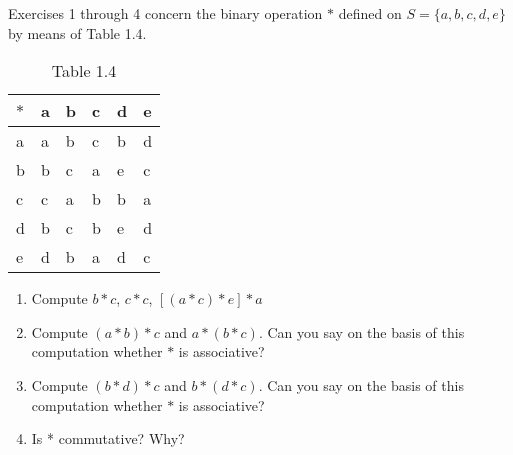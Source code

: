 \documentclass[10pt,letterpaper]{article}
\begin{document}
Exercises 1 through 4 concern the binary operation $ \ast $ defined on $S=\{a,b,c,d,e\}$ by means of Table 1.4.
  \begin{table}[h]
    \begin{center}
      \begin{tabular}{l|l|l|l|l|l}
        $\ast$ & a & b & c & d & e \\
        \hline
        a & a & b & c & b & d \\
        \hline
        b & b & c & a & e & c\\
        \hline
        c & c & a & b & b & a\\
        \hline
        d & b & c & b & e & d \\
        \hline
        e & d & b & a & d & c
      \end{tabular}
    \end{center}
    \captionsetup{labelformat=empty}
    \caption{Table 1.4}
  \end{table}
  \begin{enumerate}
    \item Compute $ b \ast c $, $ c \ast c $, $ [(a \ast c) \ast e] \ast a $
    \item Compute $ (a \ast b) \ast c $ and $a \ast (b \ast c)$. Can you say on the basis of this computation whether $\ast$ is associative?
    \item Compute $(b \ast d) \ast c$ and $b \ast (d \ast c)$. Can you say on the basis of this computation whether $\ast$ is associative?
    \item Is * commutative? Why?
  \end{enumerate}
  
\end{document}

